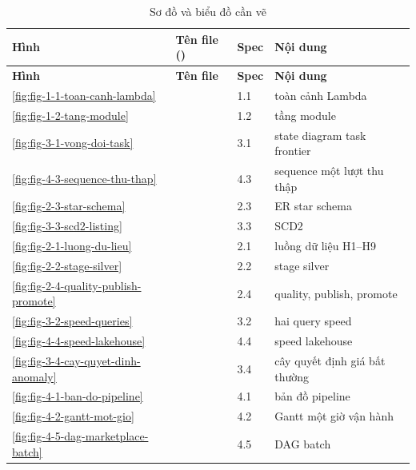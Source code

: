 \begin{xltabular}{\linewidth}{@{}C{12mm}L{58mm}L{18mm}Y@{}}
  \caption{Sơ đồ và biểu đồ cần vẽ}\label{tab:figure-slots}\\
  \toprule
  \textbf{Hình} & \textbf{Tên file ()} & \textbf{Spec} & \textbf{Nội dung} \\
  \midrule
  \endfirsthead
  \toprule \textbf{Hình} & \textbf{Tên file} & \textbf{Spec} & \textbf{Nội dung} \\ \midrule
  \endhead
  \ref{fig:fig-1-1-toan-canh-lambda} &  & 1.1 & toàn cảnh Lambda \\
  \ref{fig:fig-1-2-tang-module} &  & 1.2 & tầng module \\
  \ref{fig:fig-3-1-vong-doi-task} &  & 3.1 & state diagram task frontier \\
  \ref{fig:fig-4-3-sequence-thu-thap} &  & 4.3 & sequence một lượt thu thập \\
  \ref{fig:fig-2-3-star-schema} &  & 2.3 & ER star schema \\
  \ref{fig:fig-3-3-scd2-listing} &  & 3.3 & SCD2  \\
  \ref{fig:fig-2-1-luong-du-lieu} &  & 2.1 & luồng dữ liệu H1--H9 \\
  \ref{fig:fig-2-2-stage-silver} &  & 2.2 & stage silver \\
  \ref{fig:fig-2-4-quality-publish-promote} &  & 2.4 & quality, publish, promote \\
  \ref{fig:fig-3-2-speed-queries} &  & 3.2 & hai query speed \\
  \ref{fig:fig-4-4-speed-lakehouse} &  & 4.4 & speed lakehouse \\
  \ref{fig:fig-3-4-cay-quyet-dinh-anomaly} &  & 3.4 & cây quyết định giá bất thường \\
  \ref{fig:fig-4-1-ban-do-pipeline} &  & 4.1 & bản đồ pipeline \\
  \ref{fig:fig-4-2-gantt-mot-gio} &  & 4.2 & Gantt một giờ vận hành \\
  \ref{fig:fig-4-5-dag-marketplace-batch} &  & 4.5 & DAG batch \\

\end{xltabular}
